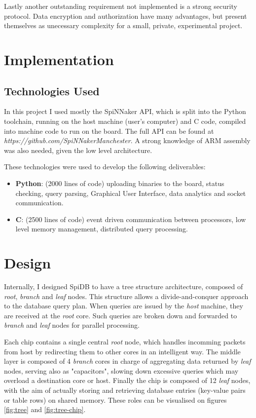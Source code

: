 Lastly another outstanding requirement not implemented is a strong security protocol. Data encryption and authorization have many advantages, but present themselves as unecessary complexity for a small, private, experimental project.

\section{Implementation}

\subsection{Technologies Used}
In this project I used mostly the SpiNNaker API, which is split into the Python toolchain, running on the host machine (user's computer) and C code, compiled into machine code to run on the board.
The full API can be found at \textit{https://github.com/SpiNNakerManchester}. A strong knowledge of ARM assembly was also needed, given the low level architecture.
 
These technologies were used to develop the following deliverables:
\begin{itemize}
	\item \textbf{Python}: (2000 lines of code) uploading binaries to the board, status checking, query parsing, Graphical User Interface, data analytics and socket communication.
	\item \textbf{C}: (2500 lines of code) event driven communication between processors, low level memory management, distributed query processing.
\end{itemize}

\section{Design}

Internally, I designed SpiDB to have a tree structure architecture, composed of \textit{root}, \textit{branch} and \textit{leaf} nodes. This structure allows a divide-and-conquer approach to the database query plan. When queries are issued by the \textit{host} machine, they are received at the \textit{root} core. Such queries are broken down and forwarded to \textit{branch} and \textit{leaf} nodes for parallel processing.

Each chip contains a single central \textit{root} node, which handles incomming packets from host by redirecting them to other cores in an intelligent way. The middle layer is composed of 4 \textit{branch} cores in charge of aggregating data returned by \textit{leaf} nodes, serving also as "capacitors", slowing down excessive queries which may overload a destination core or host. Finally the chip is composed of 12 \textit{leaf} nodes, with the aim of actually storing and retrieving database entries (key-value pairs or table rows) on shared memory. These roles can be visualised on figures \ref{fig:tree} and \ref{fig:tree-chip}.

